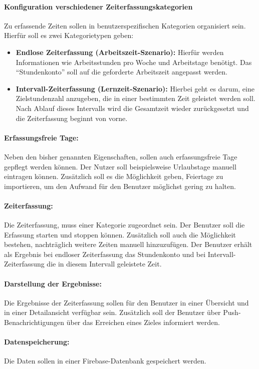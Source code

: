 \paragraph{Konfiguration verschiedener Zeiterfassungskategorien}
Zu erfassende Zeiten sollen in benutzerspezifischen Kategorien organisiert sein.
Hierfür soll es zwei Kategorietypen geben:
\begin{itemize}
    \item \textbf{Endlose Zeiterfassung (Arbeitszeit-Szenario):} Hierfür werden
    Informationen wie Arbeitsstunden pro Woche und Arbeitstage benötigt.
    Das \enquote{Stundenkonto} soll auf die geforderte Arbeitszeit angepasst werden.
    \item \textbf{Intervall-Zeiterfassung (Lernzeit-Szenario):} Hierbei geht es darum, eine
    Zielstundenzahl anzugeben, die in einer bestimmten Zeit geleistet werden soll. Nach Ablauf dieses Intervalls
    wird die Gesamtzeit wieder zurückgesetzt und die Zeiterfassung beginnt von vorne.
\end{itemize}
\paragraph{Erfassungsfreie Tage:}
Neben den bisher genannten Eigenschaften, sollen auch erfassungsfreie Tage gepflegt werden können.
Der Nutzer soll beispielsweise Urlaubstage manuell eintragen können.
Zusätzlich soll es die Möglichkeit geben,
Feiertage zu importieren, um den Aufwand für den Benutzer möglichst gering zu halten.
\paragraph{Zeiterfassung:}
Die Zeiterfassung, muss einer Kategorie zugeordnet sein. Der Benutzer soll die Erfassung starten und stoppen können.
Zusätzlich soll auch die Möglichkeit bestehen, nachträglich weitere Zeiten manuell hinzuzufügen.
Der Benutzer erhält als Ergebnis bei endloser Zeiterfassung das Stundenkonto und bei Intervall-Zeiterfassung die in diesem Intervall geleistete Zeit.
\paragraph{Darstellung der Ergebnisse:}
Die Ergebnisse der Zeiterfassung sollen für den Benutzer in einer Übersicht und in einer Detailansicht verfügbar sein.
Zusätzlich soll der Benutzer über Push-Benachrichtigungen über das Erreichen eines Zieles informiert werden.
\paragraph{Datenspeicherung:}
Die Daten sollen in einer Firebase-Datenbank gespeichert werden.
